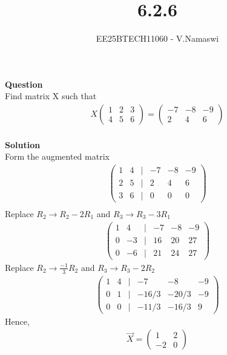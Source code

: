 \documentclass[journal]{IEEEtran}
\begin{document}

\vspace{3cm}

\title{6.2.6}
\author{EE25BTECH11060 - V.Namaswi}
{\let\newpage\relax\maketitle}
\renewcommand{\thefigure}{\theenumi}
\renewcommand{\thetable}{\theenumi}
\setlength{\intextsep}{10pt} %
\textbf{Question}\\
Find matrix X such that\\
\begin{align*}
   X \begin{pmatrix}
        1 & 2 & 3\\
        4 & 5 & 6
    \end{pmatrix}= \begin{pmatrix}
        -7 & -8 & -9 \\ 2 & 4 & 6
    \end{pmatrix}
    \end{align*}\\
\textbf{Solution}\\
Form the augmented matrix  
\begin{align}
   \begin{pmatrix}
1 & 4 & | & -7 & -8 & -9 \\
2 & 5 & | & 2 & 4 & 6 \\
3 & 6 & | & 0 & 0 & 0
\end{pmatrix} \\ 
\end{align}
Replace $R_2 \to R_2-2R_1 $ and $R_3 \to R_3-3R_1$
\begin{align}
\begin{pmatrix}
1 & 4 & | & -7 & -8 & -9 \\
0 & -3 & | & 16 & 20 & 27 \\
0 & -6 & | & 21 & 24 & 27
\end{pmatrix} 
\end{align}
Replace $R_2 \to \frac{-1}{3}R_2$ and $R_3 \to R_3-2R_2$
\begin{align}
\begin{pmatrix}
1 & 4 & | & -7 & -8 & -9 \\
0 & 1 & | & -16/3 & -20/3 & -9 \\
0 & 0 & | & -11/3 & -16/3 & 9
\end{pmatrix}
\end{align}
Hence,
\begin{align}
    \Vec{X}=\begin{pmatrix}
    1 & 2\\
    -2 &  0
\end{pmatrix}
\end{align} 
\end{document}
